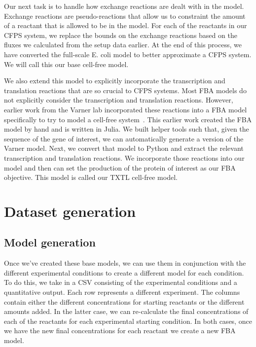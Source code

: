 Our next task is to handle how exchange reactions are dealt with in the model.
Exchange reactions are pseudo-reactions that allow us to constraint the amount of a reactant that is allowed to be in the model.
For each of the reactants in our CFPS system, we replace the bounds on the exchange reactions based on the fluxes we calculated from the setup data earlier.
At the end of this process, we have converted the full-scale E. coli model to better approximate a CFPS system.
We will call this our base cell-free model.

We also extend this model to explicitly incorporate the transcription and translation reactions that are so crucial to CFPS systems.
Most FBA models do not explicitly consider the transcription and translation reactions.
However, earlier work from the Varner lab incorporated these reactions into a FBA model specifically to try to model a cell-free system~\cite{vilkhovoy2017sequence}.
This earlier work created the FBA model by hand and is written in Julia.
We built helper tools such that, given the sequence of the gene of interest, we can automatically generate a version of the Varner model.
Next, we convert that model to Python and extract the relevant transcription and translation reactions.
We incorporate those reactions into our model and then can set the production of the protein of interest as our FBA objective.
This model is called our TXTL cell-free model.


\section{Dataset generation}

\subsection{Model generation}
Once we've created these base models, we can use them in conjunction with the different experimental conditions to create a different model for each condition.
To do this, we take in a CSV consisting of the experimental conditions and a quantitative output.
Each row represents a different experiment.
The columns contain either the different concentrations for starting reactants or the different amounts added.
In the latter case, we can re-calculate the final concentrations of each of the reactants for each experimental starting condition.
In both cases, once we have the new final concentrations for each reactant we create a new FBA model.

